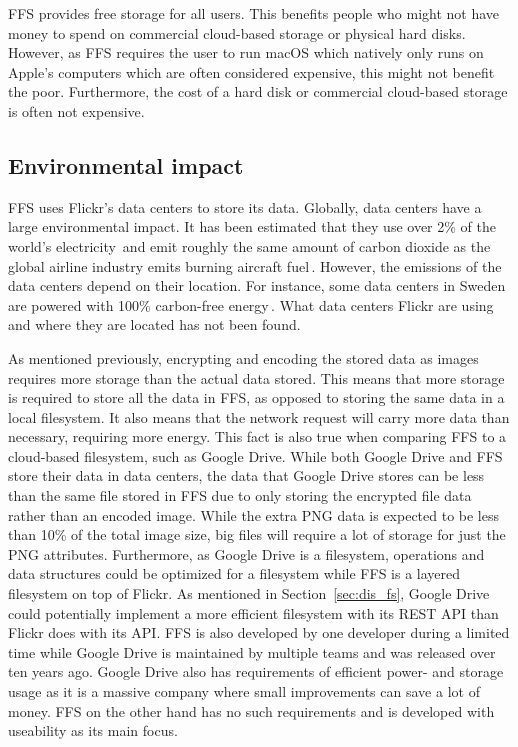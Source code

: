 \gls{FFS} provides free storage for all users. This benefits people who might not have money to spend on commercial \mbox{cloud-based} storage or physical hard disks. However, as \gls{FFS} requires the user to run macOS which natively only runs on Apple's computers which are often considered expensive, this might not benefit the poor. Furthermore, the cost of a hard disk or commercial \mbox{cloud-based} storage is often not expensive.

\subsection{Environmental impact}
\label{subsec:imp_env}
\gls{FFS} uses Flickr's data centers to store its data. Globally, data centers have a large environmental impact. It has been estimated that they use over 2\% of the world's electricity\,\cite{mcleanDataCentersGenerate2020} and emit roughly the same amount of carbon dioxide as the global airline industry emits burning aircraft fuel\,\cite{pearceEnergyHogsCan}. However, the emissions of the data centers depend on their location. For instance, some data centers in Sweden are powered with 100\% carbon-free energy\,\cite{cappellaSwedenSustainableData2022,unfcccEcoDataCenterSwedenUNFCCC}. What data centers Flickr are using and where they are located has not been found.

As mentioned previously, encrypting and encoding the stored data as images requires more storage than the actual data stored. This means that more storage is required to store all the data in \gls{FFS}, as opposed to storing the same data in a local filesystem. It also means that the network request will carry more data than necessary, requiring more energy. This fact is also true when comparing \gls{FFS} to a \mbox{cloud-based} filesystem, such as Google Drive. While both Google Drive and \gls{FFS} store their data in data centers, the data that Google Drive stores can be less than the same file stored in \gls{FFS} due to only storing the encrypted file data rather than an encoded image. While the extra PNG data is expected to be less than 10\% of the total image size, big files will require a lot of storage for just the PNG attributes. Furthermore, as Google Drive is a filesystem, operations and data structures could be optimized for a filesystem while \gls{FFS} is a layered filesystem on top of Flickr. As mentioned in Section~\ref{sec:dis_fs}, Google Drive could potentially implement a more efficient filesystem with its REST \gls{API} than Flickr does with its \gls{API}. \gls{FFS} is also developed by one developer during a limited time while Google Drive is maintained by multiple teams and was released over ten years ago. Google Drive also has requirements of efficient power- and storage usage as it is a massive company where small improvements can save a lot of money. \gls{FFS} on the other hand has no such requirements and is developed with useability as its main focus. 

